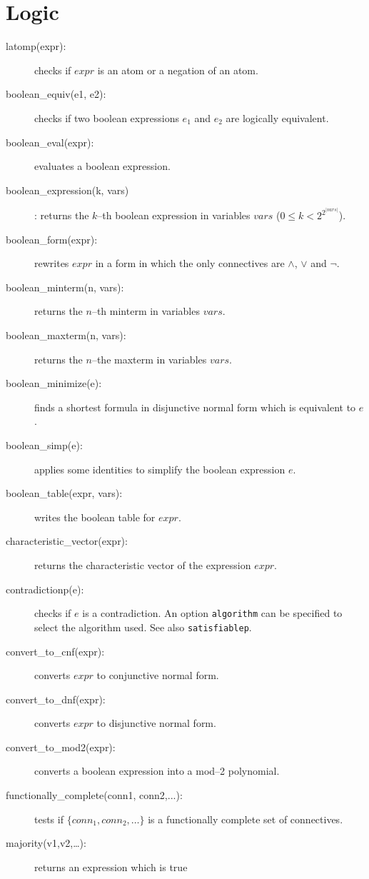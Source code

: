 \documentclass[11pt]{article}
\begin{document}
\section{Logic}
\begin{description}
  \item[latomp(expr):] checks if $expr$ is an atom or a negation of an
    atom.
  \item[boolean\_equiv(e1, e2):] checks if two boolean expressions
    $e_1$ and $e_2$ are logically equivalent.
  \item[boolean\_eval(expr):] evaluates a boolean expression.
  \item[boolean\_expression(k, vars)]: returns the $k$--th boolean
    expression in variables $vars$ ($0\leq k < 2^{2^{|vars|}}$).
  \item[boolean\_form(expr):] rewrites $expr$ in a form in which the
    only connectives are $\land$, $\lor$ and $\lnot$.
  \item[boolean\_minterm(n, vars):] returns the $n$--th minterm in
    variables $vars$.
  \item[boolean\_maxterm(n, vars):] returns the $n$--the maxterm in
    variables $vars$.
  \item[boolean\_minimize(e):] finds a shortest formula in disjunctive
    normal form which is equivalent to $e$.
  \item [boolean\_simp(e):] applies some identities to simplify the
    boolean expression $e$.
  \item[boolean\_table(expr, vars):] writes the boolean table for
    $expr$.
  \item[characteristic\_vector(expr):] returns the characteristic
    vector of the expression $expr$.
  \item[contradictionp(e):] checks if $e$ is a contradiction. An
    option \texttt{algorithm} can be specified to select the algorithm
    used. See also \texttt{satisfiablep}.
  \item[convert\_to\_cnf(expr):] converts $expr$ to conjunctive normal
    form.
  \item[convert\_to\_dnf(expr):] converts $expr$ to disjunctive normal
    form.
  \item[convert\_to\_mod2(expr):] converts a boolean expression into a
    mod--2 polynomial.
  \item[functionally\_complete(conn1, conn2,...):] tests if $\{conn_1,
    conn_2, \ldots\}$ is a functionally complete set of connectives.
  \item[majority(v1,v2,\ldots):] returns an expression which is true

\end{description}
\end{document}
